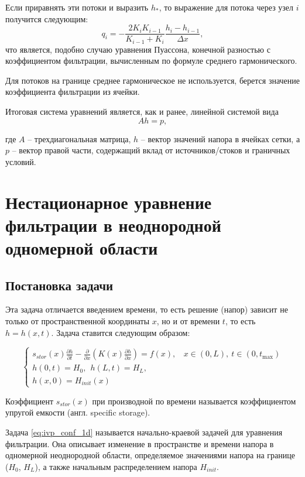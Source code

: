 \documentclass[a4paper, 11pt]{article}
\begin{document}
Если приравнять эти потоки и выразить $h_*$, то выражение для потока через узел $i$ получится следующим:
\begin{equation}
	q_i = -\frac{2K_i K_{i-1}}{K_{i-1} + K_i}\frac{h_i - h_{i-1}}{\Delta x},
\end{equation}
что является, подобно случаю уравнения Пуассона, конечной разностью с коэффициентом фильтрации, вычисленным по формуле среднего гармонического. 

Для потоков на границе среднее гармоническое не используется, берется значение коэффициента фильтрации из ячейки.

Итоговая система уравнений является, как и ранее, линейной системой вида 
\begin{equation}\label{eq:Ahp}
	Ah = p,
\end{equation}

где $A$ -- трехдиагональная матрица, $h$ -- вектор значений напора в ячейках сетки, а $p$ -- вектор правой части, содержащий вклад от источников/стоков и граничных условий. 


\section{Нестационарное уравнение фильтрации в неоднородной одномерной области}
\subsection{Постановка задачи}
Эта задача отличается введением времени, то есть решение (напор) зависит не только от пространственной координаты $x$, но и от времени $t$, то есть $h = h(x,t)$. Задача ставится следующим образом:

\begin{equation}\label{eq:ivp_conf_1d}
	\begin{cases}
		s_{stor}(x)\frac{\partial h}{\partial t} - \frac{\partial}{\partial x}\left(K(x)\frac{\partial h}{\partial x}\right) = f(x), ~~~~ x \in (0,L), ~ t\in(0, t_{\max})\\
		h(0,t) = H_0,~~h(L,t) = H_L,\\
		h(x,0) = H_{init}(x)
	\end{cases}
\end{equation}

Коэффициент $s_{stor}(x)$ при производной по времени называется коэффициентом упругой емкости (англ. specific storage).

Задача \eqref{eq:ivp_conf_1d} называется начально-краевой задачей для уравнения фильтрации. Она описывает изменение в пространстве и времени напора в одномерной неоднородной области, определяемое значениями напора на границе ($H_0$, $H_L$), а также начальным распределением напора $H_{init}$. 
\end{document}

